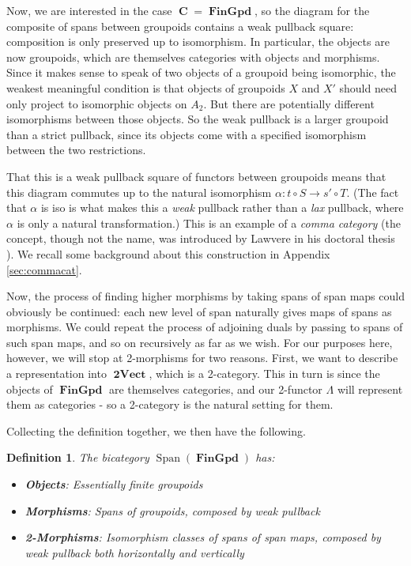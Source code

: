 \documentclass[10pt]{amsart}
\numberwithin{theorem}{subsection}
\newtheorem{definition}[theorem]{Definition}
\newcommand{\opname}[1]{\operatorname{#1}}
\newcommand{\catname}[1]{\boldsymbol{\opname{{#1}}}}
\newcommand{\C}{\catname{C}}
\newcommand{\Span}{\opname{Span}}
\newcommand{\iiV}{\catname{2Vect}}
\newcommand{\Gpd}{\catname{FinGpd}}
\newcommand{\FV}{\Lambda}
\begin{document}
Now, we are interested in the case $\C = \Gpd$, so the diagram for the
composite of spans between groupoids contains a weak pullback square:
composition is only preserved up to isomorphism.  In particular, the
objects are now groupoids, which are themselves categories with
objects and morphisms.  Since it makes sense to speak of two objects
of a groupoid being isomorphic, the weakest meaningful condition is
that objects of groupoids $X$ and $X'$ should need only project to
isomorphic objects on $A_2$.  But there are potentially different
isomorphisms between those objects.  So the weak pullback is a larger
groupoid than a strict pullback, since its objects come with a
specified isomorphism between the two restrictions.

That this is a weak pullback square of functors between groupoids
means that this diagram commutes up to the natural isomorphism $\alpha
: t \circ S \longrightarrow s' \circ T$.  (The fact that $\alpha$ is
iso is what makes this a \textit{weak} pullback rather than a
\textit{lax} pullback, where $\alpha$ is only a natural
transformation.)  This is an example of a \textit{comma category} (the
concept, though not the name, was introduced by Lawvere in his
doctoral thesis \cite{lawverethesis}).  We recall some background
about this construction in Appendix \ref{sec:commacat}.

Now, the process of finding higher morphisms by taking spans of span
maps could obviously be continued: each new level of span naturally
gives maps of spans as morphisms.  We could repeat the process of
adjoining duals by passing to spans of such span maps, and so on
recursively as far as we wish.  For our purposes here, however, we
will stop at 2-morphisms for two reasons.  First, we want to describe
a representation into $\iiV$, which is a 2-category.  This in turn is
since the objects of $\Gpd$ are themselves categories, and our
2-functor $\FV$ will represent them as categories - so a 2-category is
the natural setting for them.

Collecting the definition together, we then have the following.

\begin{definition}\label{def:spangpd}
The bicategory $\Span(\Gpd)$ has:
\begin{itemize}
\item \textbf{Objects}: Essentially finite groupoids
\item \textbf{Morphisms}: Spans of groupoids, composed by weak pullback
\item \textbf{2-Morphisms}: Isomorphism classes of spans of span maps,
  composed by weak pullback both horizontally and vertically
\end{itemize}
\end{definition}
\end{document}
